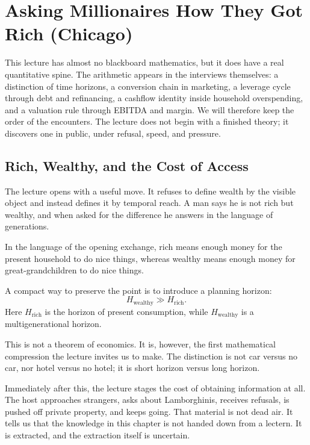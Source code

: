 \chapter{Asking Millionaires How They Got Rich (Chicago)}

This lecture has almost no blackboard mathematics, but it does have a real quantitative spine. The arithmetic appears in the interviews themselves: a distinction of time horizons, a conversion chain in marketing, a leverage cycle through debt and refinancing, a cashflow identity inside household overspending, and a valuation rule through EBITDA and margin. We will therefore keep the order of the encounters. The lecture does not begin with a finished theory; it discovers one in public, under refusal, speed, and pressure.

\section{Rich, Wealthy, and the Cost of Access}

The lecture opens with a useful move. It refuses to define wealth by the visible object and instead defines it by temporal reach. A man says he is not rich but wealthy, and when asked for the difference he answers in the language of generations.

\begin{definition}
In the language of the opening exchange, rich means enough money for the present household to do nice things, whereas wealthy means enough money for great-grandchildren to do nice things.
\end{definition}

A compact way to preserve the point is to introduce a planning horizon:
\begin{equation}
H_{\text{wealthy}} \gg H_{\text{rich}}.
\end{equation}
Here \(H_{\text{rich}}\) is the horizon of present consumption, while \(H_{\text{wealthy}}\) is a multigenerational horizon.

This is not a theorem of economics. It is, however, the first mathematical compression the lecture invites us to make. The distinction is not car versus no car, nor hotel versus no hotel; it is short horizon versus long horizon.

Immediately after this, the lecture stages the cost of obtaining information at all. The host approaches strangers, asks about Lamborghinis, receives refusals, is pushed off private property, and keeps going. That material is not dead air. It tells us that the knowledge in this chapter is not handed down from a lectern. It is extracted, and the extraction itself is uncertain.

